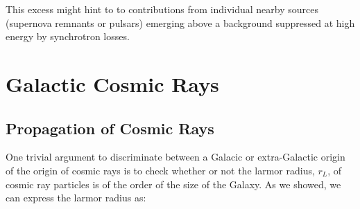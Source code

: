 \documentclass[
  letterpaper,
  DIV=11,
  numbers=noendperiod]{scrreprt}
\begin{document}
\begin{figure}[H]


\caption{\label{fig-positrons}}

\end{figure}%

This excess might hint to to contributions from individual nearby
sources (supernova remnants or pulsars) emerging above a background
suppressed at high energy by synchrotron losses.

\section*{Galactic Cosmic Rays}\label{galactic-cosmic-rays}


\subsection*{Propagation of Cosmic
Rays}\label{propagation-of-cosmic-rays}

One trivial argument to discriminate between a Galacic or extra-Galactic
origin of the origin of cosmic rays is to check whether or not the
larmor radius, \(r_L\), of cosmic ray particles is of the order of the
size of the Galaxy. As we showed, we can express the larmor radius as:
\end{document}
